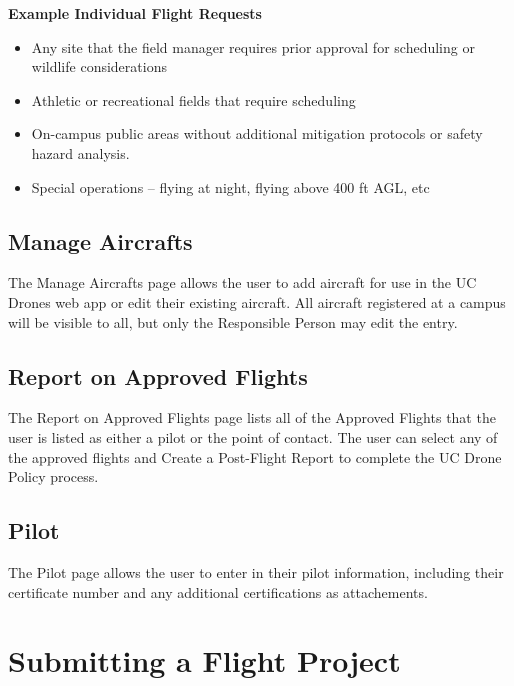 \documentclass[
]{book}
\providecommand{\tightlist}{%
  \setlength{\itemsep}{0pt}\setlength{\parskip}{0pt}}
\begin{document}
\textbf{Example Individual Flight Requests}

\begin{itemize}
\tightlist
\item
  Any site that the field manager requires prior approval for scheduling or wildlife considerations
\item
  Athletic or recreational fields that require scheduling
\item
  On-campus public areas without additional mitigation protocols or safety hazard analysis.
\item
  Special operations -- flying at night, flying above 400 ft AGL, etc
\end{itemize}

\hypertarget{manage-aircrafts}{%
\section{Manage Aircrafts}\label{manage-aircrafts}}

The Manage Aircrafts page allows the user to add aircraft for use in the UC Drones web app or edit their existing aircraft. All aircraft registered at a campus will be visible to all, but only the Responsible Person may edit the entry.

\hypertarget{report-on-approved-flights}{%
\section{Report on Approved Flights}\label{report-on-approved-flights}}

The Report on Approved Flights page lists all of the Approved Flights that the user is listed as either a pilot or the point of contact. The user can select any of the approved flights and Create a Post-Flight Report to complete the UC Drone Policy process.

\hypertarget{pilot}{%
\section{Pilot}\label{pilot}}

The Pilot page allows the user to enter in their pilot information, including their certificate number and any additional certifications as attachements.

\hypertarget{ch-UCDrones-project}{%
\chapter{Submitting a Flight Project}\label{ch-UCDrones-project}}
\end{document}
